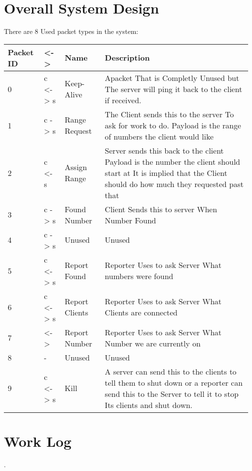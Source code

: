 \documentclass[letterpaper,10pt,titlepage]{article}
\begin{document}
\tableofcontents

\section{Overall System Design}

There are 8 Used packet types in the system:

\begin{center}
    \begin{tabular}{ | l | l | l | p{5cm} |}
    \hline
    Packet ID & <-> & Name & Description \\ \hline
    0 & c <-> s & Keep-Alive & Apacket That is Completly Unused but   
    The server will ping it back to the client if received. \\ \hline
    1 & c -> s & Range Request & The Client sends this to the server
    To ask for work to do.  Payload is the range
    of numbers the client would like \\ \hline
    2 & c <- s & Assign Range & Server sends this back to the client
    Payload is the number the client should start at
    It is implied that the Client should do how much they requested past that \\ \hline
	3 & c -> s & Found Number & Client Sends this to server When Number Found \\ \hline
	4 & c -> s & Unused & Unused \\ \hline
	5 & c <-> s & Report Found & Reporter Uses to ask Server What numbers were found \\ \hline
	6 & c <-> s & Report Clients & Reporter Uses to ask Server What Clients are connected \\ \hline
	7 & <-> & Report Number & Reporter Uses to ask Server What Number we are currently on \\ \hline
	8 & - & Unused & Unused \\ \hline
	9 & c <-> s & Kill & A server can send this to the clients to tell them to shut down
    or a reporter can send this to the Server to tell it to stop
	Its clients and shut down.\\ \hline
    \end{tabular}
\end{center}



\section{Work Log}

.
\end{document}
